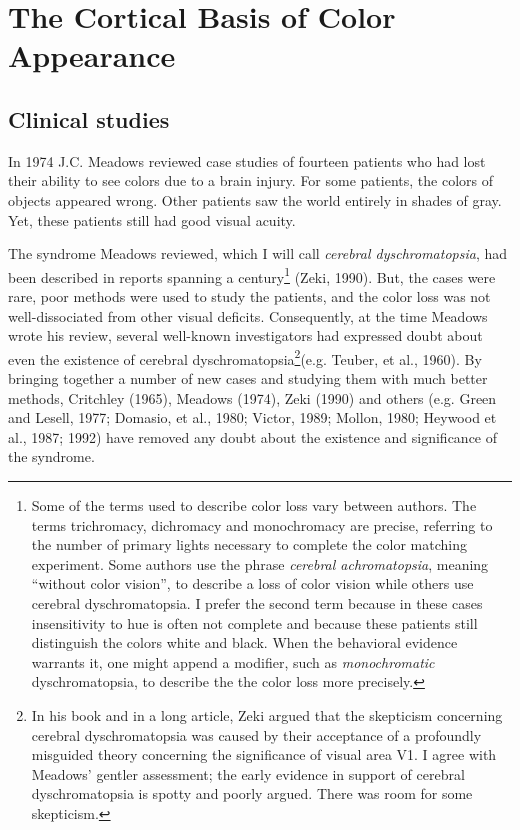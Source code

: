 \section{The Cortical Basis of Color Appearance}

\subsection*{Clinical studies}
In 1974 J.C. Meadows reviewed case studies of fourteen patients who
had lost their ability to see colors due to a brain injury.  For some
patients, the colors of objects appeared wrong.  Other patients saw
the world entirely in shades of gray.  Yet, these patients still had
good visual acuity.

The syndrome Meadows reviewed, which I will call {\em cerebral
dyschromatopsia}, had been described in reports spanning a
century\footnote{ Some of the terms used to describe color loss vary
between authors.  The terms trichromacy, dichromacy and monochromacy
are precise, referring to the number of primary lights necessary to
complete the color matching experiment.  Some authors use the phrase
{\em cerebral achromatopsia}, meaning ``without color vision'', to
describe a loss of color vision while others use cerebral
dyschromatopsia.  I prefer the second term because in these cases
insensitivity to hue is often not complete and because these patients
still distinguish the colors white and black.  When the behavioral
evidence warrants it, one might append a modifier, such as {\em
monochromatic} dyschromatopsia, to describe the the color loss more
precisely.}  (Zeki, 1990).  But, the cases were rare, poor methods
were used to study the patients, and the color loss was not
well-dissociated from other visual deficits.  Consequently, at the
time Meadows wrote his review, several well-known investigators had
expressed doubt about even the existence of cerebral
dyschromatopsia\footnote{ In his book and in a long article, Zeki
argued that the skepticism concerning cerebral dyschromatopsia was
caused by their acceptance of a profoundly misguided theory concerning
the significance of visual area V1.  I agree with Meadows' gentler
assessment; the early evidence in support of cerebral dyschromatopsia
is spotty and poorly argued.  There was room for some
skepticism.}(e.g. Teuber, et al., 1960).  By bringing together a
number of new cases and studying them with much better methods,
Critchley (1965), Meadows (1974), Zeki (1990) and others (e.g. Green
and Lesell, 1977; Domasio, et al., 1980; Victor, 1989; Mollon, 1980;
Heywood et al., 1987; 1992) have removed any doubt about the existence
and significance of the syndrome.

